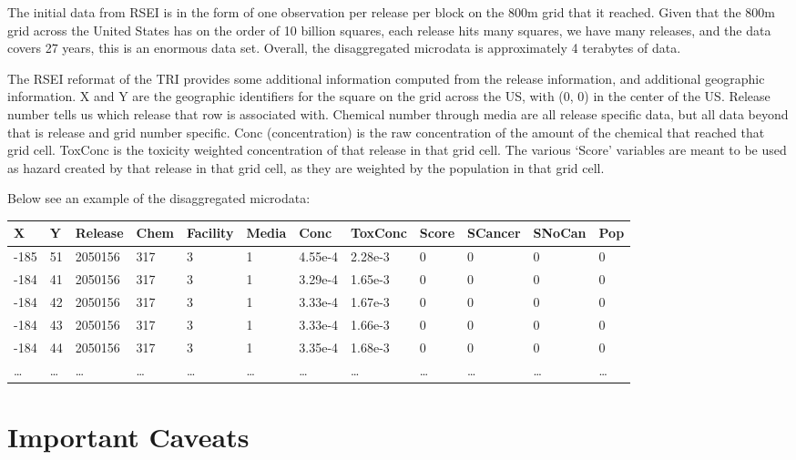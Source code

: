 \documentclass[12pt,twoside]{dukestatscithesis}
\theoremstyle{definition}
\theoremstyle{definition}
\theoremstyle{definition}
\theoremstyle{remark}
\begin{document}
The initial data from RSEI is in the form of one observation per release
per block on the 800m grid that it reached. Given that the 800m grid
across the United States has on the order of 10 billion squares, each
release hits many squares, we have many releases, and the data covers 27
years, this is an enormous data set. Overall, the disaggregated
microdata is approximately 4 terabytes of data.

The RSEI reformat of the TRI provides some additional information
computed from the release information, and additional geographic
information. X and Y are the geographic identifiers for the square on
the grid across the US, with (0, 0) in the center of the US. Release
number tells us which release that row is associated with. Chemical
number through media are all release specific data, but all data beyond
that is release and grid number specific. Conc (concentration) is the
raw concentration of the amount of the chemical that reached that grid
cell. ToxConc is the toxicity weighted concentration of that release in
that grid cell. The various `Score' variables are meant to be used as
hazard created by that release in that grid cell, as they are weighted
by the population in that grid cell.

Below see an example of the disaggregated microdata:
\begin{longtable}[]{@{}llllllllllll@{}}
\toprule
X & Y & Release & Chem & Facility & Media & Conc & ToxConc & Score &
SCancer & SNoCan & Pop\tabularnewline
\midrule
\endhead
-185 & 51 & 2050156 & 317 & 3 & 1 & 4.55e-4 & 2.28e-3 & 0 & 0 & 0 &
0\tabularnewline
-184 & 41 & 2050156 & 317 & 3 & 1 & 3.29e-4 & 1.65e-3 & 0 & 0 & 0 &
0\tabularnewline
-184 & 42 & 2050156 & 317 & 3 & 1 & 3.33e-4 & 1.67e-3 & 0 & 0 & 0 &
0\tabularnewline
-184 & 43 & 2050156 & 317 & 3 & 1 & 3.33e-4 & 1.66e-3 & 0 & 0 & 0 &
0\tabularnewline
-184 & 44 & 2050156 & 317 & 3 & 1 & 3.35e-4 & 1.68e-3 & 0 & 0 & 0 &
0\tabularnewline
\ldots{} & \ldots{} & \ldots{} & \ldots{} & \ldots{} & \ldots{} &
\ldots{} & \ldots{} & \ldots{} & \ldots{} & \ldots{} &
\ldots{}\tabularnewline
\bottomrule
\end{longtable}
\section{Important Caveats}\label{important-caveats}
\end{document}
